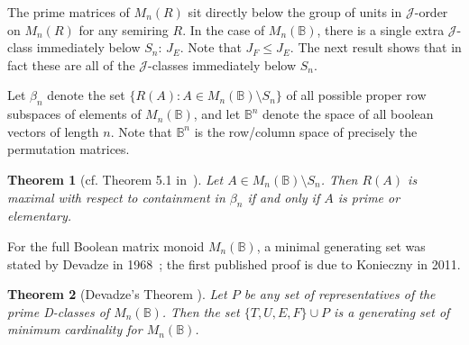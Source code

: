 \documentclass[11pt]{article}
\newtheorem{thm}{Theorem}[section]
\numberwithin{equation}{section}
\newcommand{\set}[2]{\ensuremath{\{#1 : #2 \}}}
\newcommand{\B}{\mathbb{B}}
\newcommand{\Bn}{M_n(\B)}
\newcommand{\J}{\mathscr{J}}
\begin{document}
The prime matrices of $M_n(R)$ sit directly below the group of units in
$\J$-order on $M_n(R)$ for any semiring $R$. In the case of $\Bn$, there is a
single extra $\J$-class immediately below $S_n$: $J_E$. Note that $J_F \leq
J_E$. The next result shows that in fact these are all of the $\J$-classes
immediately below $S_n$.

Let $\beta_n$ denote the set $\set{R(A)}{A\in \Bn\setminus S_n}$ of all
possible proper row subspaces of elements of $\Bn$, and let $\B^n$ denote
the space of all boolean vectors of length $n$. Note that $\B^n$ is the
row/column space of precisely the permutation matrices.

\begin{thm}[cf. Theorem 5.1 in~\cite{Caen1981ab}]
  Let $A \in \Bn\setminus S_n$. Then $R(A)$ is maximal with respect to
  containment in $\beta_n$ if and only if $A$ is prime or elementary.  
\end{thm}

For the full Boolean matrix monoid $\Bn$, a minimal generating set was stated by
Devadze in 1968~\cite{TODO}; the first published proof is due to Konieczny in
2011.

\begin{thm}[Devadze's Theorem \cite{Konieczny2011aa}]
  Let $P$ be any set of representatives of the prime D-classes of $\Bn$. Then
  the set $\{T, U, E, F\} \cup P$ is a generating set of minimum cardinality for
  $\Bn$.
\end{thm}
\end{document}

